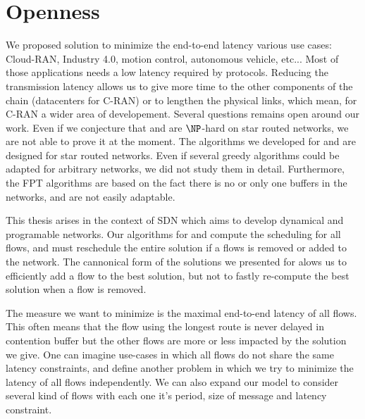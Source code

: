 \section*{Openness}

We proposed solution to minimize the end-to-end latency various use cases: Cloud-RAN, Industry 4.0, motion control, autonomous vehicle, etc... Most of those applications needs a low latency required by protocols. Reducing the transmission latency allows us to give more time to the other components of the chain (datacenters for C-RAN) or to lengthen the physical links, which mean, for C-RAN a wider area of developement.
Several questions remains open around our work. Even if we conjecture that \PAZL and \PALL are $\NP$-hard on star routed networks, we are not able to prove it at the moment. 
The algorithms we developed for \PAZL and \PALL are designed for star routed networks. Even if several greedy algorithms could be adapted for arbitrary networks, we did not study them in detail. Furthermore, the FPT algorithms are based on the fact there is no or only one buffers in the networks, and are not easily adaptable.

This thesis arises in the context of SDN which aims to develop dynamical and programable networks. Our algorithms for \PAZL and \PALL compute the scheduling for all flows, and must reschedule the entire solution if a flows is removed or added to the network. The cannonical form of the solutions we presented for \SPALL alows us to efficiently add a flow to the best solution, but not to fastly re-compute the best solution when a flow is removed.

The measure we want to minimize is the maximal end-to-end latency of all flows. This often means that the flow using the longest route is never delayed in contention buffer but the other flows are more or less impacted by the solution we give. One can imagine use-cases in which all flows do not share the same latency constraints, and define another problem in which we try to minimize the latency of all flows independently. We can also expand our model to consider several kind of flows with each one it's period, size of message and latency constraint. 




